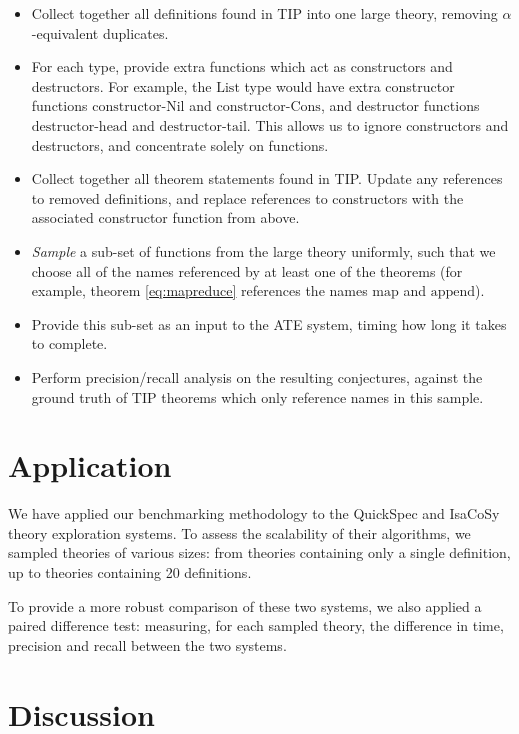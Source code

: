 \begin{itemize}
\item Collect together all definitions found in TIP into one large theory,
  removing $\alpha$-equivalent duplicates.
\item For each type, provide extra functions which act as constructors and
  destructors. For example, the $\text{List}$ type would have extra constructor
  functions $\text{constructor-Nil}$ and $\text{constructor-Cons}$, and
  destructor functions $\text{destructor-head}$ and $\text{destructor-tail}$.
  This allows us to ignore constructors and destructors, and concentrate solely
  on functions.
\item Collect together all theorem statements found in TIP. Update any
  references to removed definitions, and replace references to constructors with
  the associated constructor function from above.
\item \emph{Sample} a sub-set of functions from the large theory uniformly, such
  that we choose all of the names referenced by at least one of the theorems
  (for example, theorem \ref{eq:mapreduce} references the names
  $\text{map}$ and $\text{append}$).
\item Provide this sub-set as an input to the ATE system, timing how long it
  takes to complete.
\item Perform precision/recall analysis on the resulting conjectures, against
  the ground truth of TIP theorems which only reference names in this sample.
\end{itemize}

\section{Application}
\label{sec:application}


We have applied our benchmarking methodology to the QuickSpec and IsaCoSy theory
exploration systems. To assess the scalability of their algorithms, we sampled
theories of various sizes: from theories containing only a single definition, up
to theories containing 20 definitions.

To provide a more robust comparison of these two systems, we also applied a
paired difference test: measuring, for each sampled theory, the difference in
time, precision and recall between the two systems.

\section{Discussion}
\label{sec:discussion}


